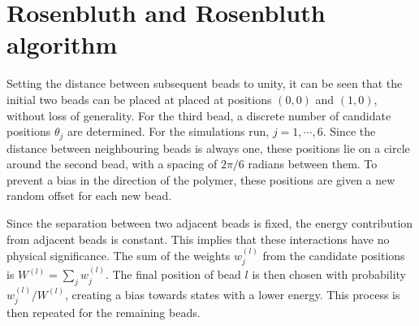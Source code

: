\section{Rosenbluth and Rosenbluth algorithm}
Setting the distance between subsequent beads to unity, it can be seen that the initial two beads can be placed at placed at positions $(0,0)$ and $(1,0)$, without loss of generality. For the third bead, a discrete number of candidate positions $\theta_j$ are determined. For the simulations run, $j=1,\cdots,6$. Since the distance between neighbouring beads is always one, these positions lie on a circle around the second bead, with a spacing of $2\pi/6$ radians between them. To prevent a bias in the direction of the polymer, these positions are given a new random offset for each new bead.

Since the separation between two adjacent beads is fixed, the energy contribution from adjacent beads is constant. This implies that these interactions have no physical significance. The sum of the weights $w_j^{(l)}$ from the candidate positions is $W^{(l)} = \sum_j w_j^{(l)}$. The final position of bead $l$ is then chosen with probability $w_j^{(l)}/W^{(l)}$, creating a bias towards states with a lower energy. This process is then repeated for the remaining beads.
